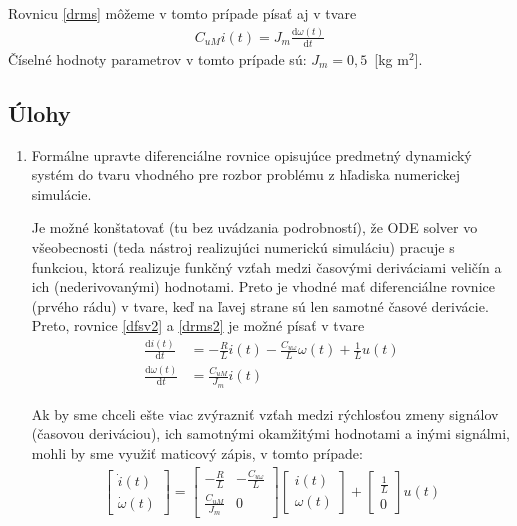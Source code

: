 \documentclass[a4paper, 10pt, ]{article}
\begin{document}
Rovnicu \eqref{drms} môžeme v tomto prípade písať aj v tvare
\begin{align} \label{drms2}
	C_{uM} i(t) = J_m \frac{\text{d}\omega(t)}{\text{d}t}
\end{align}
Číselné hodnoty parametrov v tomto prípade sú: $J_m = 0,5$~[kg m${}^2$].



\subsection{Úlohy}

\begin{enumerate}[leftmargin=0pt, labelsep=4mm, itemsep=0pt]

	\item Formálne upravte diferenciálne rovnice opisujúce predmetný dynamický systém do tvaru vhodného pre rozbor problému z hľadiska numerickej simulácie.

	Je možné konštatovať (tu bez uvádzania podrobností), že ODE solver vo všeobecnosti (teda nástroj realizujúci numerickú simuláciu) pracuje s funkciou, ktorá realizuje funkčný vzťah medzi časovými deriváciami veličín a ich (nederivovanými) hodnotami. Preto je vhodné mať diferenciálne rovnice (prvého rádu) v tvare, keď na ľavej strane sú len samotné časové derivácie. Preto, rovnice \eqref{dfsv2} a \eqref{drms2} je možné písať v tvare
	\begin{align*}
		\frac{\text{d}i(t)}{\text{d}t} &= -\frac{R}{L} i(t) -\frac{C_{u\omega}}{L} \omega(t) + \frac{1}{L} u(t) \\
		\frac{\text{d}\omega(t)}{\text{d}t} &= \frac{C_{uM}}{J_m} i(t)
	\end{align*}

	Ak by sme chceli ešte viac zvýrazniť vzťah medzi rýchlosťou zmeny signálov (časovou deriváciou), ich samotnými okamžitými hodnotami a inými signálmi, mohli by sme využiť maticový zápis, v tomto prípade:
	\begin{align*}
		\begin{bmatrix}
			\dot i(t) \\ \dot \omega(t)
		\end{bmatrix}
		=
		\begin{bmatrix}
			-\frac{R}{L} & -\frac{C_{u\omega}}{L} \\
			\frac{C_{uM}}{J_m} & 0
		\end{bmatrix}
		\begin{bmatrix}
			i(t) \\ \omega(t)
		\end{bmatrix}
		+
		\begin{bmatrix}
			\frac{1}{L} \\ 0
		\end{bmatrix}
		u(t)
	\end{align*}




\end{enumerate}
\end{document}
